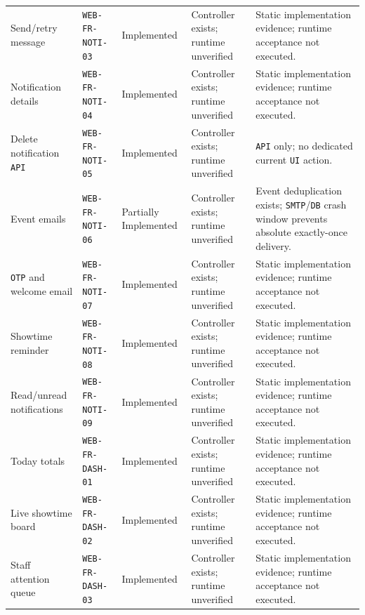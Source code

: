 \begin{longtable}{@{}P{0.19000\SRSWidth}P{0.18000\SRSWidth}P{0.15000\SRSWidth}P{0.20000\SRSWidth}P{0.28000\SRSWidth}@{}}
Send/\allowbreak{}retry message & \texttt{WEB-\allowbreak{}FR-\allowbreak{}NOTI-\allowbreak{}03} & Implemented & Controller exists; runtime unverified & Static implementation evidence; runtime acceptance not executed. \\[3pt]
Notification details & \texttt{WEB-\allowbreak{}FR-\allowbreak{}NOTI-\allowbreak{}04} & Implemented & Controller exists; runtime unverified & Static implementation evidence; runtime acceptance not executed. \\[3pt]
Delete notification \texttt{API} & \texttt{WEB-\allowbreak{}FR-\allowbreak{}NOTI-\allowbreak{}05} & Implemented & Controller exists; runtime unverified & \texttt{API} only; no dedicated current \texttt{UI} action. \\[3pt]
Event emails & \texttt{WEB-\allowbreak{}FR-\allowbreak{}NOTI-\allowbreak{}06} & Partially Implemented & Controller exists; runtime unverified & Event deduplication exists; \texttt{SMTP}/\allowbreak{}\texttt{DB} crash window prevents absolute exactly-once delivery. \\[3pt]
\texttt{OTP} and welcome email & \texttt{WEB-\allowbreak{}FR-\allowbreak{}NOTI-\allowbreak{}07} & Implemented & Controller exists; runtime unverified & Static implementation evidence; runtime acceptance not executed. \\[3pt]
Showtime reminder & \texttt{WEB-\allowbreak{}FR-\allowbreak{}NOTI-\allowbreak{}08} & Implemented & Controller exists; runtime unverified & Static implementation evidence; runtime acceptance not executed. \\[3pt]
Read/\allowbreak{}unread notifications & \texttt{WEB-\allowbreak{}FR-\allowbreak{}NOTI-\allowbreak{}09} & Implemented & Controller exists; runtime unverified & Static implementation evidence; runtime acceptance not executed. \\[3pt]
Today totals & \texttt{WEB-\allowbreak{}FR-\allowbreak{}DASH-\allowbreak{}01} & Implemented & Controller exists; runtime unverified & Static implementation evidence; runtime acceptance not executed. \\[3pt]
Live showtime board & \texttt{WEB-\allowbreak{}FR-\allowbreak{}DASH-\allowbreak{}02} & Implemented & Controller exists; runtime unverified & Static implementation evidence; runtime acceptance not executed. \\[3pt]
Staff attention queue & \texttt{WEB-\allowbreak{}FR-\allowbreak{}DASH-\allowbreak{}03} & Implemented & Controller exists; runtime unverified & Static implementation evidence; runtime acceptance not executed. \\[3pt]

\end{longtable}

